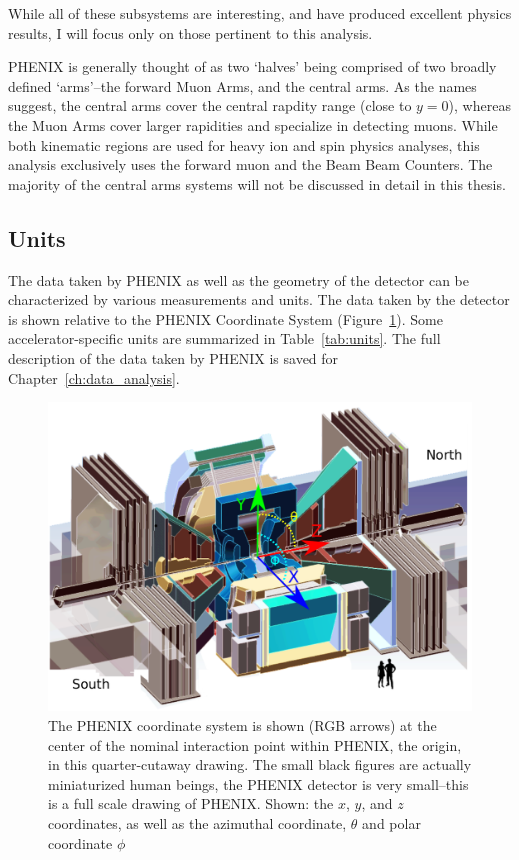 While all of these subsystems are interesting, and have produced excellent
physics results, I will focus only on those pertinent to this analysis.

PHENIX is generally thought of as two `halves' being comprised of two broadly
defined `arms'--the forward Muon Arms, and the central arms. As the names
suggest, the central arms cover the central rapdity range (close to $y=0$),
whereas the Muon Arms cover larger rapidities and specialize in detecting muons.
While both kinematic regions are used for heavy ion and spin physics analyses,
this analysis exclusively uses the forward muon and the Beam Beam Counters. The
majority of the central arms systems will not be discussed in detail in this
thesis.

\subsection{Units}

The data taken by PHENIX as well as the geometry of the detector can be
characterized by various measurements and units. The data taken by the detector
is shown relative to the PHENIX Coordinate System
(Figure~\ref{fig:phenix_coordinate_system}). Some accelerator-specific units
are summarized in Table~\ref{tab:units}. The full description of the data taken
by PHENIX is saved for Chapter~\ref{ch:data_analysis}.

\begin{figure}[ht]
  \centering
  \includegraphics[width=\linewidth]{./figures/phenix_coordinate_system.png}
  \caption{
    The PHENIX coordinate system is shown (RGB arrows) at the center of the
    nominal interaction point within PHENIX, the origin, in this quarter-cutaway
    drawing. The small black figures are actually miniaturized human beings, the
    PHENIX detector is very small--this is a full scale drawing of PHENIX.
    Shown: the $x$, $y$, and $z$ coordinates, as well as the azimuthal
    coordinate, $\theta$ and polar coordinate $\phi$ ~\cite{WebPHENIXDrawings}
  }
  \label{fig:phenix_coordinate_system}

\end{figure}

